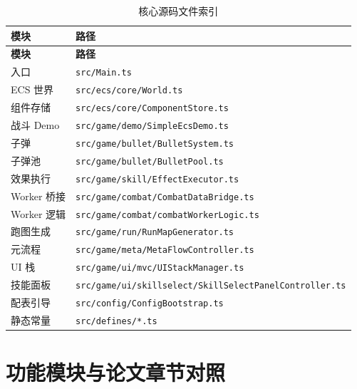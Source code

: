 \documentclass[UTF8,a4paper]{ctexart}
\begin{document}
\begin{longtable}{p{3.5cm}p{9cm}}
  \caption{核心源码文件索引} \label{tab:file-index} \\
  \toprule
  \textbf{模块} & \textbf{路径} \\
  \midrule
  \endfirsthead
  \toprule
  \textbf{模块} & \textbf{路径} \\
  \midrule
  \endhead
  入口 & \texttt{src/Main.ts} \\
  ECS 世界 & \texttt{src/ecs/core/World.ts} \\
  组件存储 & \texttt{src/ecs/core/ComponentStore.ts} \\
  战斗 Demo & \texttt{src/game/demo/SimpleEcsDemo.ts} \\
  子弹 & \texttt{src/game/bullet/BulletSystem.ts} \\
  子弹池 & \texttt{src/game/bullet/BulletPool.ts} \\
  效果执行 & \texttt{src/game/skill/EffectExecutor.ts} \\
  Worker 桥接 & \texttt{src/game/combat/CombatDataBridge.ts} \\
  Worker 逻辑 & \texttt{src/game/combat/combatWorkerLogic.ts} \\
  跑图生成 & \texttt{src/game/run/RunMapGenerator.ts} \\
  元流程 & \texttt{src/game/meta/MetaFlowController.ts} \\
  UI 栈 & \texttt{src/game/ui/mvc/UIStackManager.ts} \\
  技能面板 & \texttt{src/game/ui/skillselect/SkillSelectPanelController.ts} \\
  配表引导 & \texttt{src/config/ConfigBootstrap.ts} \\
  静态常量 & \texttt{src/defines/*.ts} \\
  \bottomrule
\end{longtable}

\section{功能模块与论文章节对照}
\label{sec:module-map}
\end{document}
